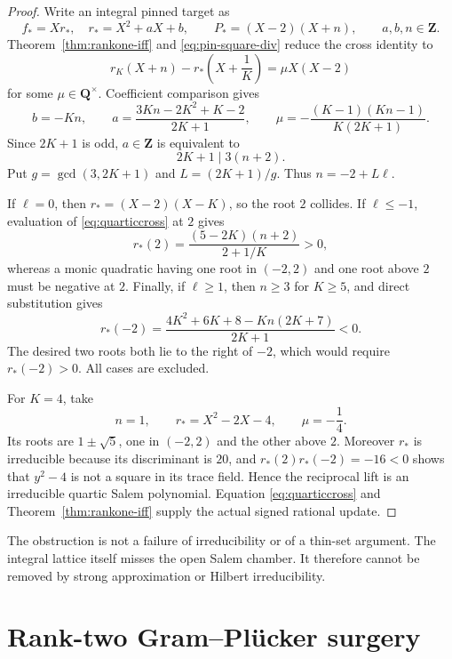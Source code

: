 \documentclass[11pt,reqno]{amsart}
\theoremstyle{definition}
\theoremstyle{remark}
\newcommand{\Q}{\mathbf Q}
\newcommand{\Z}{\mathbf Z}
\begin{document}
\begin{proof}
Write an integral pinned target as
\[
 f_*=Xr_*,\quad r_*=X^2+aX+b,\qquad
 P_*=(X-2)(X+n),\qquad a,b,n\in\Z.
\]
Theorem~\ref{thm:rankone-iff} and \eqref{eq:pin-square-div} reduce the cross
identity to
\begin{equation}\label{eq:quarticcross}
 r_K(X+n)-r_*\left(X+\frac1K\right)=\mu X(X-2)
\end{equation}
for some $\mu\in\Q^\times$.  Coefficient comparison gives
\begin{equation}\label{eq:quarticcoeffs}
 b=-Kn,\qquad
 a=\frac{3Kn-2K^2+K-2}{2K+1},\qquad
 \mu=-\frac{(K-1)(Kn-1)}{K(2K+1)}.
\end{equation}
Since $2K+1$ is odd, $a\in\Z$ is equivalent to
\begin{equation}\label{eq:congruence}
 2K+1\mid3(n+2).
\end{equation}
Put $g=\gcd(3,2K+1)$ and $L=(2K+1)/g$.  Thus $n=-2+L\ell$.

If $\ell=0$, then $r_*=(X-2)(X-K)$, so the root $2$ collides.  If
$\ell\leq-1$, evaluation of \eqref{eq:quarticcross} at $2$ gives
\[
 r_*(2)=\frac{(5-2K)(n+2)}{2+1/K}>0,
\]
whereas a monic quadratic having one root in $(-2,2)$ and one root above $2$
must be negative at $2$.  Finally, if $\ell\geq1$, then $n\geq3$ for
$K\geq5$, and direct substitution gives
\[
 r_*(-2)=\frac{4K^2+6K+8-Kn(2K+7)}{2K+1}<0.
\]
The desired two roots both lie to the right of $-2$, which would require
$r_*(-2)>0$.  All cases are excluded.

For $K=4$, take
\[
 n=1,\qquad r_*=X^2-2X-4,\qquad \mu=-\frac14.
\]
Its roots are $1\pm\sqrt5$, one in $(-2,2)$ and the other above $2$.
Moreover $r_*$ is irreducible because its discriminant is $20$, and
$r_*(2)r_*(-2)=-16<0$ shows that $y^2-4$ is not a square in its trace
field.  Hence the reciprocal lift is an irreducible quartic Salem polynomial.
Equation \eqref{eq:quarticcross} and Theorem~\ref{thm:rankone-iff} supply the
actual signed rational update.
\end{proof}

The obstruction is not a failure of irreducibility or of a thin-set
argument.  The integral lattice itself misses the open Salem chamber.  It
therefore cannot be removed by strong approximation or Hilbert
irreducibility.

\section{Rank-two Gram--Pl\"ucker surgery}
\end{document}
